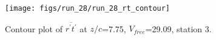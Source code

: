 \begin{figure}[H]
\centering
\texttt{[image: figs/run\_28/run\_28\_rt\_contour]}
\caption{Contour plot of $\overline{r^\prime t^\prime}$ at $z/c$=7.75, $V_{free}$=29.09, station 3.}
\label{fig:run_28_rt_contour}
\end{figure}


